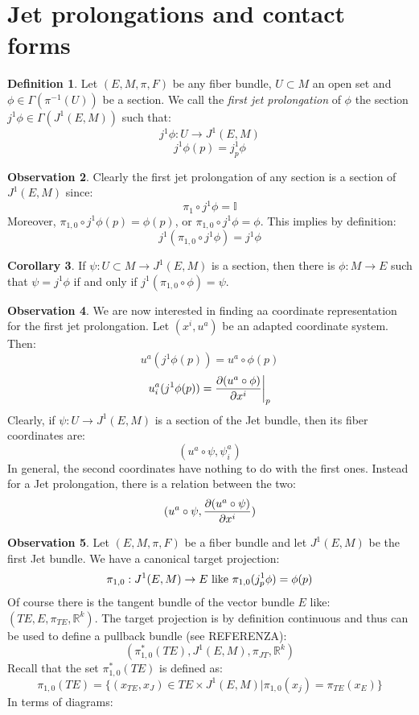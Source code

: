 \documentclass[12pt,a4paper]{report}
\theoremstyle{definition}
\newtheorem{Def}{Definition}[chapter]
\theoremstyle{Theorem}
\theoremstyle{definition}
\theoremstyle{definition}
\newtheorem{Cor}[Def]{Corollary}
\newtheorem{Obs}[Def]{Observation}
\begin{document}
	\section{Jet prolongations and contact forms}
	\begin{Def}
		Let $(E,M,\pi,F)$ be any fiber bundle, $U\subset M$ an open set and $\phi\in\Gamma(\pi^{-1}(U))$ be a section. We call the \textit{first jet prolongation} of $\phi$ the section $j^1\phi\in\Gamma(J^1(E,M))$ such that:
		$$j^1\phi:U\rightarrow J^1(E,M)$$
		$$j^1\phi(p)=j^1_p\phi$$
	\end{Def}
	\begin{Obs}
		Clearly the first jet prolongation of any section is a section of $J^1(E,M)$ since:
		$$\pi_1\circ j^1\phi=\mathbb{I}$$
		Moreover, $\pi_{1,0}\circ j^1\phi(p)=\phi(p)$, or $\pi_{1,0}\circ j^1\phi=\phi$. This implies by definition:
		$$j^1(\pi_{1,0}\circ j^1\phi)=j^1\phi$$
	\end{Obs}
	\begin{Cor}
		If $\psi:U\subset M\rightarrow J^1(E,M)$ is a section, then there is $\phi:M\rightarrow E$ such that $\psi=j^1\phi$ if and only if $j^1(\pi_{1,0}\circ \phi)=\psi$.
	\end{Cor}
	\begin{Obs}
		We are now interested in finding aa coordinate representation for the first jet prolongation. Let $(x^i,u^a)$ be an adapted coordinate system. Then:
		$$u^a(j^1\phi(p))=u^a\circ \phi (p)$$
		$$u_i^a(j^1\phi(p))={\partial (u^a\circ \phi)\over \partial x^i}\bigg|_p$$
		Clearly, if $\psi:U\rightarrow J^1(E,M)$ is a section of the Jet bundle, then its fiber coordinates are:
		$$(u^a\circ \psi,\psi^a_i)$$
		In general, the second coordinates have nothing to do with the first ones. Instead for a Jet prolongation, there is a relation between the two:
		$$(u^a\circ \psi,{\partial (u^a\circ \psi)\over \partial x^i})$$
	\end{Obs}
	\begin{Obs}
		Let $(E,M,\pi,F)$ be a fiber bundle and let $J^1(E,M)$ be the first Jet bundle. We have a canonical target projection:
		$$\pi_{1,0}:J^1(E,M)\rightarrow E\hbox{ like } \pi_{1,0}(j^1_p\phi)=\phi(p)$$
		Of course there is the tangent bundle of the vector bundle $E$ like: $(TE,E,\pi_{TE},\mathbb{R}^k)$.
		The target projection is by definition continuous and thus can be used to define a pullback bundle (see REFERENZA):
		$$(\pi_{1,0}^*(TE),J^1(E,M),\pi_{JT},\mathbb{R}^{k})$$
		Recall that the set $\pi_{1,0}^*(TE)$ is defined as:
		$$\pi_{1,0}(TE)=\bigg\{(x_{TE},x_J)\in TE\times J^1(E,M)\bigg|\pi_{1,0}(x_j)=\pi_{TE}(x_E)\bigg\}$$
		In terms of diagrams:
		\begin{center}
		\end{center}
	\end{Obs}
\end{document}
